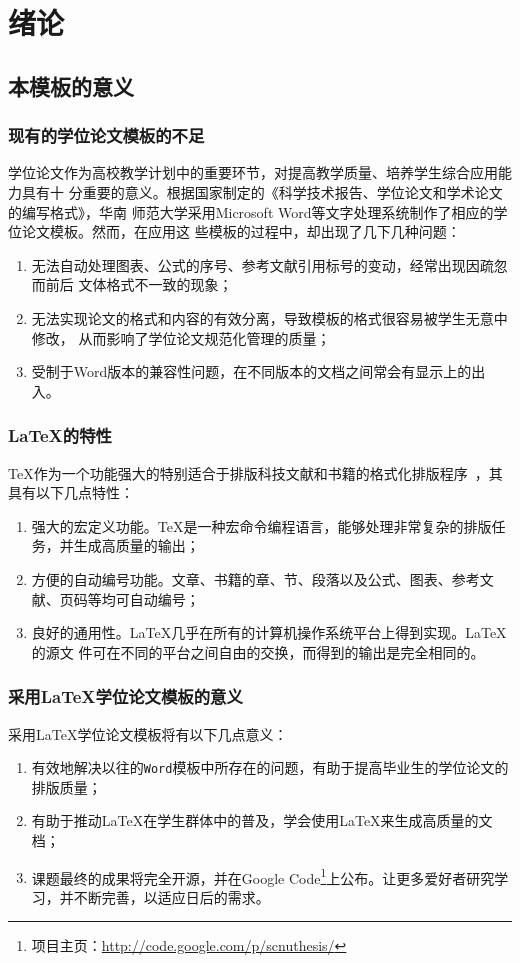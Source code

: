 \chapter{绪论}

\section{本模板的意义}

\subsection{现有的学位论文模板的不足}
学位论文作为高校教学计划中的重要环节，对提高教学质量、培养学生综合应用能力具有十%
分重要的意义。根据国家制定的《科学技术报告、学位论文和学术论文的编写格式》，华南%
师范大学采用Microsoft Word等文字处理系统制作了相应的学位论文模板。然而，在应用这%
些模板的过程中，却出现了几下几种问题\cite{Maddage2009}：
\begin{enumerate}
\item 无法自动处理图表、公式的序号、参考文献引用标号的变动，经常出现因疏忽而前后%
  文体格式不一致的现象；
\item 无法实现论文的格式和内容的有效分离，导致模板的格式很容易被学生无意中修改，%
  从而影响了学位论文规范化管理的质量；
\item 受制于Word版本的兼容性问题，在不同版本的文档之间常会有显示上的出入。%
\end{enumerate}

\subsection{\LaTeX{}的特性}
\TeX{}作为一个功能强大的特别适合于排版科技文献和书籍的格式化排版程序~，其具有以下几点特性：
\begin{enumerate}
\item 强大的宏定义功能。\TeX{}是一种宏命令编程语言，能够处理非常复杂的排版任务，并生成高质量的输出；
\item 方便的自动编号功能。文章、书籍的章、节、段落以及公式、图表、参考文献、页码等均可自动编号；
\item 良好的通用性。\LaTeX{}几乎在所有的计算机操作系统平台上得到实现。\LaTeX{}的源文%
  件可在不同的平台之间自由的交换，而得到的输出是完全相同的。
\end{enumerate}




\subsection{采用\LaTeX{}学位论文模板的意义}
采用\LaTeX{}学位论文模板将有以下几点意义：
\begin{enumerate}
\item 有效地解决以往的\verb|Word|模板中所存在的问题，有助于提高毕业生的学位论文的排版质量；
\item 有助于推动LaTeX在学生群体中的普及，学会使用\LaTeX{}来生成高质量的文档；
\item 课题最终的成果将完全开源，并在Google Code\footnote{项目主页：\url{http://code.google.com/p/scnuthesis/}}上公布。让更多爱好者研究学习，并不断完善，以适应日后的需求。
\end{enumerate}



